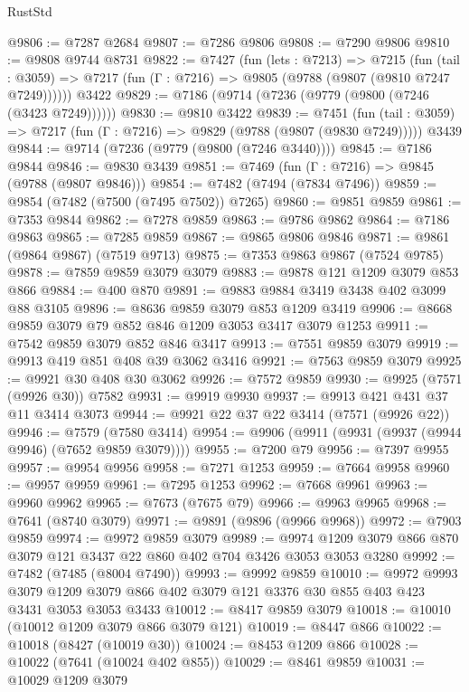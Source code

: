 \begin{lexlean}{RustStd}
\begin{coremodule}
{\begin{coremodule}
{{{{{{{{{{{{{{{{{{{{{{{{{{{{{{{{@9806 := @7287 @2684
@9807 := @7286 @9806
@9808 := @7290 @9806
@9810 := @9808 @9744 @8731
@9822 := @7427
    (fun (lets : @7213) =>
    @7215
      (fun (tail : @3059) => @7217 (fun (Γ : @7216) => @9805 (@9788 (@9807 (@9810 @7247 @7249))))))
    @3422
@9829 := @7186 (@9714 (@7236 (@9779 (@9800 (@7246 (@3423 @7249))))))
@9830 := @9810 @3422
@9839 := @7451
    (fun (tail : @3059) => @7217 (fun (Γ : @7216) => @9829 (@9788 (@9807 (@9830 @7249)))))
    @3439
@9844 := @9714 (@7236 (@9779 (@9800 (@7246 @3440))))
@9845 := @7186 @9844
@9846 := @9830 @3439
@9851 := @7469 (fun (Γ : @7216) => @9845 (@9788 (@9807 @9846)))
@9854 := @7482 (@7494 (@7834 @7496))
@9859 := @9854 (@7482 (@7500 (@7495 @7502)) @7265)
@9860 := @9851 @9859
@9861 := @7353 @9844
@9862 := @7278 @9859
@9863 := @9786 @9862
@9864 := @7186 @9863
@9865 := @7285 @9859
@9867 := @9865 @9806 @9846
@9871 := @9861 (@9864 @9867) (@7519 @9713)
@9875 := @7353 @9863 @9867 (@7524 @9785)
@9878 := @7859 @9859 @3079 @3079
@9883 := @9878 @121 @1209 @3079 @853 @866
@9884 := @400 @870
@9891 := @9883 @9884 @3419 @3438 @402 @3099 @88 @3105
@9896 := @8636 @9859 @3079 @853 @1209 @3419
@9906 := @8668 @9859 @3079 @79 @852 @846 @1209 @3053 @3417 @3079 @1253
@9911 := @7542 @9859 @3079 @852 @846 @3417
@9913 := @7551 @9859 @3079
@9919 := @9913 @419 @851 @408 @39 @3062 @3416
@9921 := @7563 @9859 @3079
@9925 := @9921 @30 @408 @30 @3062
@9926 := @7572 @9859
@9930 := @9925 (@7571 (@9926 @30)) @7582
@9931 := @9919 @9930
@9937 := @9913 @421 @431 @37 @11 @3414 @3073
@9944 := @9921 @22 @37 @22 @3414 (@7571 (@9926 @22))
@9946 := @7579 (@7580 @3414)
@9954 := @9906 (@9911 (@9931 (@9937 (@9944 @9946) (@7652 @9859 @3079))))
@9955 := @7200 @79
@9956 := @7397 @9955
@9957 := @9954 @9956
@9958 := @7271 @1253
@9959 := @7664 @9958
@9960 := @9957 @9959
@9961 := @7295 @1253
@9962 := @7668 @9961
@9963 := @9960 @9962
@9965 := @7673 (@7675 @79)
@9966 := @9963 @9965
@9968 := @7641 (@8740 @3079)
@9971 := @9891 (@9896 (@9966 @9968))
@9972 := @7903 @9859
@9974 := @9972 @9859 @3079
@9989 := @9974 @1209 @3079 @866 @870 @3079 @121 @3437 @22 @860 @402 @704 @3426 @3053 @3053 @3280
@9992 := @7482 (@7485 (@8004 @7490))
@9993 := @9992 @9859
@10010 := @9972
    @9993
    @3079
    @1209
    @3079
    @866
    @402
    @3079
    @121
    @3376
    @30
    @855
    @403
    @423
    @3431
    @3053
    @3053
    @3433
@10012 := @8417 @9859 @3079
@10018 := @10010 (@10012 @1209 @3079 @866 @3079 @121)
@10019 := @8447 @866
@10022 := @10018 (@8427 (@10019 @30))
@10024 := @8453 @1209 @866
@10028 := @10022 (@7641 (@10024 @402 @855))
@10029 := @8461 @9859
@10031 := @10029 @1209 @3079
}}}}}}}}}}}}}}}}}}}}}}}}}}}}}}}}
\end{coremodule}}
\end{coremodule}
\end{lexlean}
